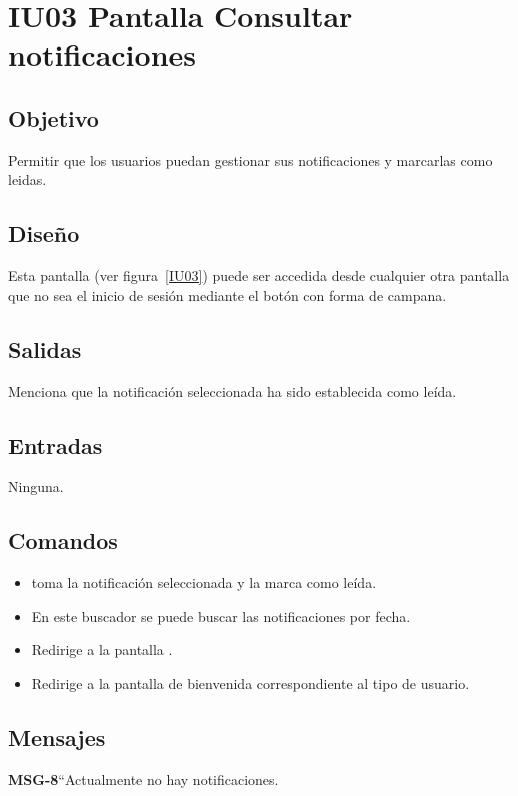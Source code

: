 
\section{IU03 Pantalla Consultar notificaciones}

\subsection{Objetivo}
Permitir que los usuarios puedan gestionar sus notificaciones y marcarlas como leidas.
\subsection{Diseño}
    Esta pantalla  (ver figura~\ref{IU03}) puede ser accedida desde cualquier otra pantalla que no sea el inicio de sesión mediante el botón con forma de campana.

\subsection{Salidas}
Menciona que la notificación seleccionada ha sido establecida como leída.
\subsection{Entradas}
   Ninguna.

\subsection{Comandos}
\begin{itemize}
    \item {} toma la notificación seleccionada y la marca como leída.
    \item {} En este buscador se puede buscar las notificaciones por fecha.
    \item {} Redirige a la pantalla .
    \item {} Redirige a la pantalla de bienvenida correspondiente al tipo de usuario.
\end{itemize}

\subsection{Mensajes}
     
\begin{Citemize}
    \item {\bf MSG-8}{``Actualmente no hay notificaciones.}
\end{Citemize}


